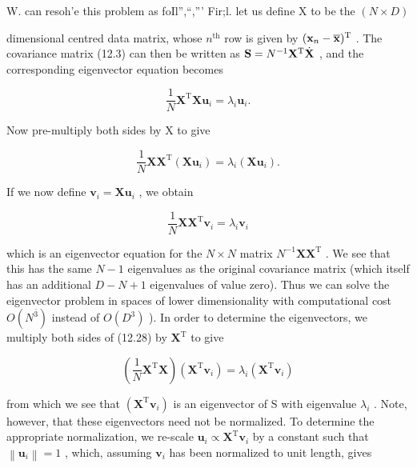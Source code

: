 \documentclass[
  10
]{article}
\begin{document}
W. can resoh'e this problem as foIl'',``,''' Fir;l. let us define X to
be the \(( N \times D )\)

dimensional centred data matrix, whose \(n ^ { \mathrm { t h } }\) row
is given by
\(( { \bf x } _ { n } - { \overline { { \bf x } } } ) ^ { \mathrm { T } }\)
. The covariance matrix (12.3) can then be written as
\({ \bf S } = N ^ { { - } 1 } { \bf X } ^ { \mathrm { T } } { \dot { \bf X } }\)
, and the corresponding eigenvector equation becomes

\[
\frac {1}{N} \mathbf {X} ^ {\mathrm{T}} \mathbf {X} \mathbf {u} _ {i} = \lambda_ {i} \mathbf {u} _ {i}.\tag{12.26}
\]

Now pre-multiply both sides by X to give

\[
\frac {1}{N} \mathbf {X X ^ {\mathrm{T}}} (\mathbf {X u} _ {i}) = \lambda_ {i} (\mathbf {X u} _ {i}).\tag{12.27}
\]

If we now define
\(\mathbf { v } _ { i } = \mathbf { X } \mathbf { u } _ { i }\) , we
obtain

\[
\frac {1}{N} \mathbf {X X ^ {\mathrm{T}}} \mathbf {v} _ {i} = \lambda_ {i} \mathbf {v} _ {i}\tag{12.28}
\]

which is an eigenvector equation for the \(N \times N\) matrix
\(N ^ { - 1 } \mathbf { X } \mathbf { X } ^ { \mathrm { { T } } }\) . We
see that this has the same \(N - 1\) eigenvalues as the original
covariance matrix (which itself has an additional \(D - N + 1\)
eigenvalues of value zero). Thus we can solve the eigenvector problem in
spaces of lower dimensionality with computational cost
\(O ( N ^ { \bar { 3 } } )\) instead of \(O ( D ^ { 3 } )\) ). In order
to determine the eigenvectors, we multiply both sides of (12.28) by
\(\mathbf { X } ^ { \mathrm { { T } } }\) to give

\[
\left(\frac {1}{N} \mathbf {X} ^ {\mathrm{T}} \mathbf {X}\right) (\mathbf {X} ^ {\mathrm{T}} \mathbf {v} _ {i}) = \lambda_ {i} (\mathbf {X} ^ {\mathrm{T}} \mathbf {v} _ {i})\tag{12.29}
\]

from which we see that
\(\left( \mathbf { X } ^ { \mathrm { { T } } } \mathbf { v } _ { i } \right)\)
is an eigenvector of S with eigenvalue \(\lambda _ { i }\) . Note,
however, that these eigenvectors need not be normalized. To determine
the appropriate normalization, we re-scale
\(\mathbf { u } _ { i } \propto \mathbf { X } ^ { \mathrm { { T } } } \mathbf { v } _ { i }\)
by a constant such that \(\left\| \mathbf { u } _ { i } \right\| = 1\) ,
which, assuming \(\mathbf { v } _ { i }\) has been normalized to unit
length, gives
\end{document}
